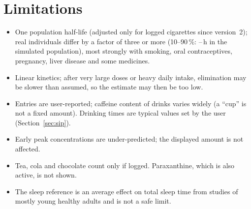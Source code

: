 \documentclass[10pt,a4paper]{article}
\begin{document}
\section{Limitations}
\begin{itemize}
\item One population half-life (adjusted only for logged cigarettes since version~2); real individuals differ by a factor of three or more
(10--90\,\%: \nTHalfTen--\nTHalfNinety\,h in the simulated population), most strongly with smoking,
oral contraceptives, pregnancy, liver disease and some medicines.
\item Linear kinetics; after very large doses or heavy daily intake, elimination may be slower than
assumed, so the estimate may then be too low.
\item Entries are user-reported; caffeine content of drinks varies widely (a ``cup'' is not a fixed amount).
Drinking times are typical values set by the user (Section~\ref{sec:sip}).
\item Early peak concentrations are under-predicted; the displayed amount is not affected.
\item Tea, cola and chocolate count only if logged. Paraxanthine, which is also active, is not shown.
\item The sleep reference is an average effect on total sleep time from studies of mostly young healthy
adults and is not a safe limit.
\end{itemize}
\end{document}
